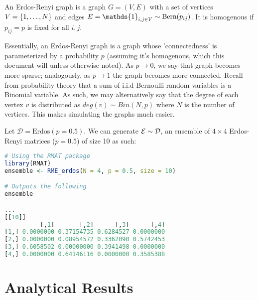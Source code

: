 \begin{definition}
An Erdos-Renyi graph is a graph $G = (V,E)$ with a set of vertices $V = \{\oneto[N]\}$ and edges $E = \mathds{1}_{i,j \in V} \sim \Bern(p_{ij})$. It is homogenous if $p_{ij} = p$ is fixed for all $i, j$.
\end{definition}

Essentially, an Erdos-Renyi graph is a graph whose 'connectedness' is parameterized by a probability $p$ (assuming it's homogenous, which this document will unless otherwise noted). As $p \to 0$, we say that graph becomes more sparse; analogously, as $p \to 1$ the graph becomes more connected.\newline
\indent Recall from probability theory that a sum of i.i.d Bernoulli random variables is a Binomial variable. As such, we may alternatively say that the degree of each vertex $v$ is distributed as $deg(v) \sim Bin(N,p)$ where $N$ is the number of vertices. This makes simulating the graphs much easier.

\begin{code}[Erdos-Renyi p = 0.5 Ensemble]
Let $\mathcal{D} = \text{Erdos}(p = 0.5)$. We can generate $\Ens \sim \D$, an ensemble of $4 \times 4$ Erdos-Renyi matrices ($p = 0.5$) of size 10 as such:
\end{code}

\begin{lstlisting}[language=R]
# Using the RMAT package
library(RMAT)
ensemble <- RME_erdos(N = 4, p = 0.5, size = 10)

# Outputs the following
ensemble

...
[[10]]
          [,1]       [,2]      [,3]      [,4]
[1,] 0.0000000 0.37154735 0.6284527 0.0000000
[2,] 0.0000000 0.08954572 0.3362090 0.5742453
[3,] 0.6058502 0.00000000 0.3941498 0.0000000
[4,] 0.0000000 0.64146116 0.0000000 0.3585388
\end{lstlisting}

\section{Analytical Results}




